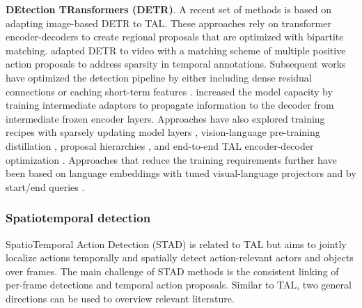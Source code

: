 \noindent
\textbf{DEtection TRansformers (DETR)}. A recent set of methods is based on adapting image-based DETR \citep{carion2020end} to TAL. These approaches rely on transformer encoder-decoders to create regional proposals that are optimized with bipartite matching. \citet{tan2021relaxed} adapted DETR to video with a matching scheme of multiple positive action proposals to address sparsity in temporal annotations. Subsequent works have optimized the detection pipeline by either including dense residual connections \citep{zhao2023re2tal} or caching short-term features \citep{cheng2022tallformer,hong2022spotting}. 
\citet{liu2024end} increased the model capacity by training intermediate adaptors to propagate information to the decoder from intermediate frozen encoder layers. Approaches have also explored training recipes with sparsely updating model layers \citep{cheng2022stochastic}, vision-language pre-training distillation \citep{ju2023distilling}, proposal hierarchies \citep{wu2023newsnet},
and end-to-end TAL encoder-decoder optimization \citep{liu2022empirical}. Approaches that reduce the training requirements further have been based on language embeddings with tuned visual-language projectors \citep{liberatori2024test} and by start/end queries \citep{aklilu2024zero}.



\subsubsection{Spatiotemporal detection} 

SpatioTemporal Action Detection (STAD) is related to TAL but aims to jointly localize actions temporally and spatially detect action-relevant actors and objects over frames. The main challenge of STAD methods is the consistent linking of per-frame detections and temporal action proposals. Similar to TAL, two general directions can be used to overview relevant literature. 



